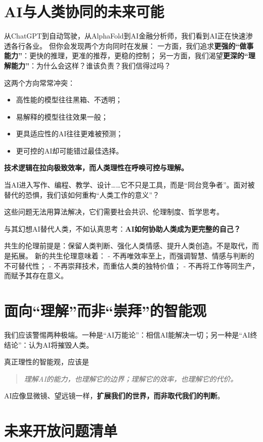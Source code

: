 \section{AI与人类协同的未来可能}
从ChatGPT到自动驾驶，从AlphaFold到AI金融分析师，我们看到AI正在快速渗透各行各业。
但你会发现两个方向同时在发展： 一方面，我们追求\textbf{更强的“做事能力”}：更快的推理，更准的推荐，更稳的控制；
另一方面，我们渴望\textbf{更深的“理解能力”}：为什么会这样？谁该负责？我们信得过吗？

这两个方向常常冲突：
\begin{itemize}
\item 高性能的模型往往黑箱、不透明；
\item 易解释的模型往往效果一般；
\item 更具适应性的AI往往更难被预测；
\item 更可控的AI却可能错过最佳选择。
\end{itemize}

\textbf{技术逻辑在拉向极致效率，而人类理性在呼唤可控与理解。}

当AI进入写作、编程、教学、设计……它不只是工具，而是“同台竞争者”。面对被替代的恐惧，我们该如何重构“人类工作的意义”？

这些问题无法用算法解决，它们需要社会共识、伦理制度、哲学思考。

与其幻想AI替代人类，不如认真思考：\textbf{AI如何协助人类成为更完整的自己？}

共生的伦理前提是：保留人类判断、强化人类情感、提升人类创造。不是取代，而是拓展。
新的共生伦理意味着：
- 不再唯效率至上，而强调智慧、情感与判断的不可替代性；
- 不再崇拜技术，而重估人类的独特价值；
- 不再将工作等同生产，而赋予其存在意义。



\section{面向“理解”而非“崇拜”的智能观}

我们应该警惕两种极端。一种是“AI万能论”：相信AI能解决一切；另一种是“AI终结论”：认为AI将摧毁人类。

真正理性的智能观，应该是
\begin{quote}
\textit{理解AI的能力，也理解它的边界；理解它的效率，也理解它的代价。}
\end{quote}

AI应像显微镜、望远镜一样，\textbf{扩展我们的世界，而非取代我们的判断}。



\section{未来开放问题清单}

